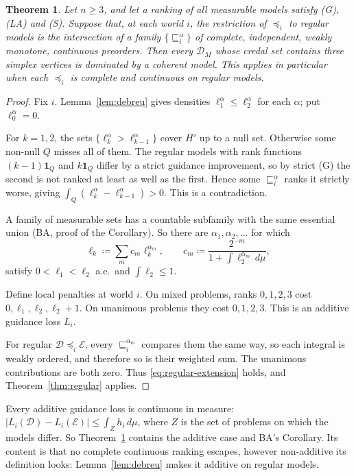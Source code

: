 \documentclass[11pt]{article}
\newtheorem{theorem}{Theorem}
\theoremstyle{remark}\newtheorem{remark}[theorem]{Remark}
\newcommand{\Dscr}{\mathcal D}
\newcommand{\Escr}{\mathcal E}
\newcommand{\one}{\mathbf 1}
\begin{document}
\begin{theorem}\label{thm:continuous}
Let $n\ge3$, and let a ranking of all measurable models satisfy (G), (LA)
and (S). Suppose that, at each world $i$, the restriction of $\preceq_i$ to
regular models is the intersection of a family $\{\sqsubseteq_i^\alpha\}$ of
complete, independent, weakly monotone, continuous preorders. Then every
$\Dscr_M$ whose credal set contains three simplex vertices is dominated by a
coherent model. This applies in particular when each $\preceq_i$ is complete
and continuous on regular models.
\end{theorem}
\begin{proof}
Fix $i$. Lemma~\ref{lem:debreu} gives densities $\ell^\alpha_1\le\ell^\alpha_2$
for each $\alpha$; put $\ell^\alpha_0=0$.

For $k=1,2$, the sets $\{\ell^\alpha_k>\ell^\alpha_{k-1}\}$ cover $H'$ up to a
null set. Otherwise some non-null $Q$ misses all of them. The regular models
with rank functions $(k-1)\one_Q$ and $k\one_Q$ differ by a strict guidance
improvement, so by strict (G) the second is not ranked at least as well as
the first. Hence some $\sqsubseteq^\alpha_i$ ranks it strictly worse, giving
$\int_Q(\ell^\alpha_k-\ell^\alpha_{k-1})>0$. This is a contradiction.

A family of measurable sets has a countable subfamily with the same essential
union (BA, proof of the Corollary). So there are $\alpha_1,\alpha_2,\ldots$ for
which
\[
 \ell_k\coloneqq\sum_mc_m\ell^{\alpha_m}_k,\qquad
 c_m\coloneqq\frac{2^{-m}}{1+\int\ell^{\alpha_m}_2\,d\mu},
\]
satisfy $0<\ell_1<\ell_2$ a.e.\ and $\int\ell_2\le1$.

Define local penalties at world $i$. On mixed problems, ranks $0,1,2,3$ cost
$0,\ell_1,\ell_2,\ell_2+1$. On unanimous problems they cost $0,1,2,3$. This is
an additive guidance loss $L_i$.

For regular $\Dscr\preceq_i\Escr$, every $\sqsubseteq^{\alpha_m}_i$ compares
them the same way, so each integral is weakly ordered, and therefore so is
their weighted sum. The unanimous contributions are both zero. Thus
\eqref{eq:regular-extension} holds, and Theorem~\ref{thm:regular} applies.
\end{proof}

Every additive guidance loss is continuous in measure:
$|L_i(\Dscr)-L_i(\Escr)|\le\int_Zh_i\,d\mu$, where $Z$ is the set of problems on
which the models differ. So Theorem~\ref{thm:continuous} contains the additive
case and BA's Corollary. Its content is that no complete continuous ranking
escapes, however non-additive its definition looks: Lemma~\ref{lem:debreu}
makes it additive on regular models.
\end{document}
